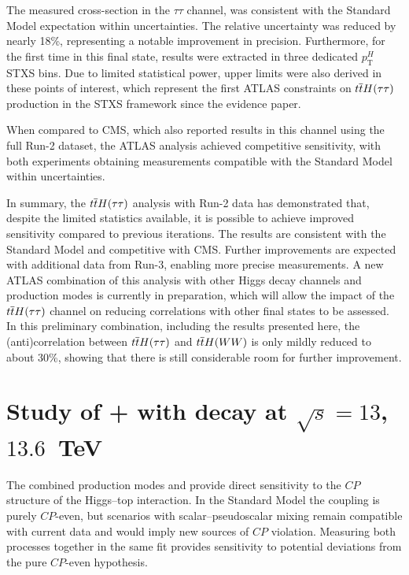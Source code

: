 The measured cross-section in the \(\tau\tau\) channel, was consistent with the Standard Model expectation within uncertainties. The relative uncertainty was reduced by nearly 18\%, representing a notable improvement in precision. Furthermore, for the first time in this final state, results were extracted in three dedicated \(p_{\mathrm{T}}^{H}\) STXS bins. Due to limited statistical power, upper limits were also derived in these points of interest, which represent the first ATLAS constraints on \(t\overline{t}H(\tau\tau)\) production in the STXS framework since the \ttH evidence paper.  

When compared to CMS, which also reported results in this channel using the full Run-2 dataset, the ATLAS analysis achieved competitive sensitivity, with both experiments obtaining measurements compatible with the Standard Model within uncertainties.  

In summary, the \(t\overline{t}H(\tau\tau)\) analysis with Run-2 data has demonstrated that, despite the limited statistics available, it is possible to achieve improved sensitivity compared to previous iterations. The results are consistent with the Standard Model and competitive with CMS. Further improvements are expected with additional data from Run-3, enabling more precise measurements. A new ATLAS combination of this analysis with other Higgs decay channels and production modes is currently in preparation, which will allow the impact of the \(t\overline{t}H(\tau\tau)\) channel on reducing correlations with other final states to be assessed. In this preliminary combination, including the results presented here, the (anti)correlation between \(t\overline{t}H(\tau\tau)\) and \(t\overline{t}H(WW)\) is only mildly reduced to about 30\%, showing that there is still considerable room for further improvement.

\section{Study of \ttH + \thqb with \htautau decay at $\sqrt{s}=13$, $13.6$~TeV}

The combined production modes \ttH and \thqb provide direct sensitivity to the $CP$ structure of the Higgs–top interaction. In the Standard Model the coupling is purely $CP$-even, but scenarios with scalar–pseudoscalar mixing remain compatible with current data and would imply new sources of $CP$ violation. Measuring both processes together in the same fit provides sensitivity to potential deviations from the pure $CP$-even hypothesis.  


